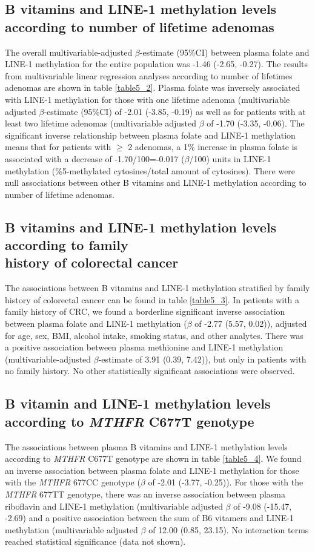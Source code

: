\subsection{B vitamins and LINE-1 methylation levels according to number of lifetime adenomas} %
\noindent The overall multivariable-adjusted $\beta$-estimate (95\%CI) between plasma folate and LINE-1 methylation for the entire population was -1.46 (-2.65, -0.27). The results from multivariable linear regression analyses according to number of lifetimes adenomas are shown in table \ref{table5_2}. Plasma folate was inversely associated with LINE-1 methylation for those with one lifetime adenoma (multivariable adjusted $\beta$-estimate (95\%CI) of -2.01 (-3.85, -0.19) as well as for patients with at least two lifetime adenomas (multivariable adjusted $\beta$ of -1.70 (-3.35, -0.06). The significant inverse relationship between plasma folate and LINE-1 methylation means that for patients with $\geq$ 2 adenomas, a 1\% increase in plasma folate is associated with a decrease of -1.70/100=-0.017 ($\beta$/100) units in LINE-1 methylation (\%5-methylated cytosines/total amount of cytosines). There were null associations between other B vitamins and LINE-1 methylation according to number of lifetime adenomas.

\subsection{B vitamins and LINE-1 methylation levels according to family\\ history of colorectal cancer} %
\noindent The associations between B vitamins and LINE-1 methylation stratified by family history of colorectal cancer can be found in table \ref{table5_3}. In patients with a family history of CRC, we found a borderline significant inverse association between plasma folate and LINE-1 methylation ($\beta$ of -2.77 (5.57, 0.02)), adjusted for age, sex, BMI, alcohol intake, smoking status, and other analytes. There was a positive association between plasma methionine and LINE-1 methylation (multivariable-adjusted $\beta$-estimate of 3.91 (0.39, 7.42)), but only in patients with no family history. No other statistically significant associations were observed.

\subsection{B vitamin and LINE-1 methylation levels according to \emph{MTHFR} C677T genotype} %
\noindent The associations between plasma B vitamins and LINE-1 methylation levels according to \emph{MTHFR} C677T genotype are shown in table \ref{table5_4}. We found an inverse association between plasma folate and LINE-1 methylation for those with the \emph{MTHFR} 677CC genotype ($\beta$ of -2.01 (-3.77, -0.25)). For those with the \emph{MTHFR} 677TT genotype, there was an inverse association between plasma riboflavin and LINE-1 methylation (multivariable adjusted $\beta$ of -9.08 (-15.47, -2.69) and a positive association between the sum of B6 vitamers and LINE-1 methylation (multivariable adjusted $\beta$ of 12.00 (0.85, 23.15). No interaction terms reached statistical significance (data not shown).

